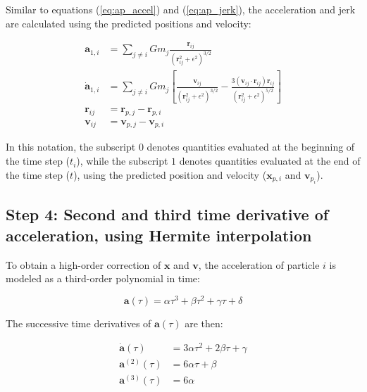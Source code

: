 \begin{appendixs}
	Similar to equations (\ref{eq:ap_accel}) and (\ref{eq:ap_jerk}), the acceleration and jerk are calculated using the predicted positions and velocity:
	
	\begin{align}
		\mathbf{a}_{1, i} &= \sum_{j \neq i} G m_j \frac{\mathbf{r}_{ij}}{(\mathbf{r}_{ij}^2 + \epsilon^2)^{3/2}} \label{eq:ap_accel_pred} \\
		\dot{\mathbf{a}}_{1, i} &= \sum_{j \neq i} G m_j \left[\frac{\mathbf{v}_{ij}}{(\mathbf{r}_{ij}^2 + \epsilon^2)^{3/2}} - \frac{3(\mathbf{v}_{ij} \cdot \mathbf{r}_{ij})\mathbf{r}_{ij}}{(\mathbf{r}_{ij}^2 + \epsilon^2)^{5/2}}\right] \label{eq:ap_jerk_pred} \\
		\mathbf{r}_{ij} &= \mathbf{r}_{p,j} - \mathbf{r}_{p,i} \\
		\mathbf{v}_{ij} &= \mathbf{v}_{p,j} - \mathbf{v}_{p,i}
	\end{align}
	
	In this notation, the subscript $0$ denotes quantities evaluated at the beginning of the time step ($t_i$), while the subscript $1$ denotes quantities evaluated at the end of the time step ($t$), using the predicted position and velocity ($\mathbf{x}_{p, i}$ and $\mathbf{v}_{p_i}$).
	
	\subsection{Step 4: Second and third time derivative of acceleration, using Hermite interpolation}
	
	To obtain a high-order correction of $\mathbf{x}$ and $\mathbf{v}$, the acceleration of particle $i$ is modeled as a third-order polynomial in time:
	
	\begin{equation}
		\mathbf{a}(\tau) = \alpha \tau^3 + \beta \tau^2 + \gamma \tau + \delta \label{eq:ap_accel_pol}
	\end{equation}
	
	The successive time derivatives of $\mathbf{a}(\tau)$ are then:
	
	\begin{align}
		\dot{\mathbf{a}}(\tau) &= 3 \alpha \tau^2 + 2 \beta \tau + \gamma \label{eq:ap_jerk_pol} \\
		\mathbf{a}^{(2)} (\tau) &= 6 \alpha \tau + \beta \label{eq:ap_a2_pol} \\
		\mathbf{a}^{(3)} (\tau) &= 6 \alpha \label{eq:ap_a3_pol}
	\end{align}
	

\end{appendixs}
